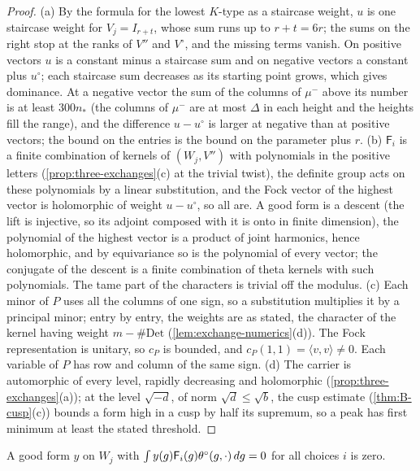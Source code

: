 \begin{proof}
(a) By the formula for the lowest $K$-type as a staircase weight, $u$ is one staircase weight for $V_j=I_{r+t}$, whose sum runs up to $r+t=6r$; the sums on the right stop at the ranks of $V''$ and $V^\circ$, and the missing terms vanish. On
positive vectors $u$ is a constant minus a staircase sum and on negative vectors a constant plus $u^\circ$; each staircase sum decreases as its starting point grows, which gives dominance. At a negative vector the sum of the columns of
$\mu^-$ above its number is at least $300n_*$ (the columns of $\mu^-$ are at most $\Delta$ in each height and the heights fill the range), and the difference $u-u^\circ$ is larger at negative than at positive vectors; the bound on the entries is the
bound on the parameter plus $r$. (b) $\mathsf F_i$ is a finite combination of kernels of $(W_j,V'')$ with polynomials in the positive letters (\cref{prop:three-exchanges}(c) at the trivial twist), the definite group acts on these polynomials by a
linear substitution, and the Fock vector of the highest vector is holomorphic of weight $u-u^\circ$, so all are. A good form is a descent (the lift is injective, so its adjoint composed with it is onto in finite dimension), the polynomial of the
highest vector is a product of joint harmonics, hence holomorphic, and by equivariance so is the polynomial of every vector; the conjugate of the descent is a finite combination of theta kernels with such polynomials. The tame part of the
characters is trivial off the modulus. (c) Each minor of $P$ uses all the columns of one sign, so a substitution multiplies it by a principal minor; entry by entry, the weights are as stated, the character of the kernel having weight
$m-\#\mathrm{Det}$ (\cref{lem:exchange-numerics}(d)). The Fock representation is unitary, so $c_P$ is bounded, and $c_P(1,1)=\langle v,v\rangle\ne0$. Each variable of $P$ has row and column of the same sign. (d) The carrier is automorphic of every
level, rapidly decreasing and holomorphic (\cref{prop:three-exchanges}(a)); at the level $\sqrt{-d}$, of norm $\sqrt d\le\sqrt b$, the cusp estimate (\cref{thm:B-cusp}(c)) bounds a form high in a cusp by half its supremum, so a peak has first minimum at
least the stated threshold.
\end{proof}

\begin{theorem}\label{thm:products-span}
A good form $y$ on $W_j$ with $\int y(g)\mathsf F_i(g)\theta^\circ(g,\cdot)\allowbreak\,dg=\nobreak0$ for all choices $i$ is zero.
\end{theorem}

